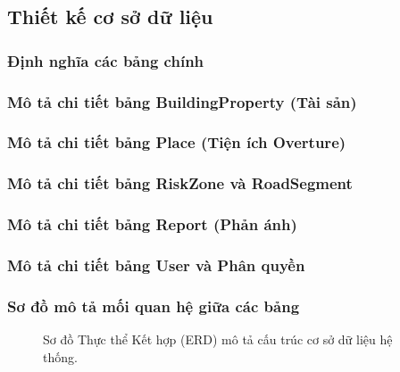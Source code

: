 \subsection{Thiết kế cơ sở dữ liệu}

\subsubsection{Định nghĩa các bảng chính}

\cleardoublepage
\subsubsection{Mô tả chi tiết bảng BuildingProperty (Tài sản)}


\subsubsection{Mô tả chi tiết bảng Place (Tiện ích Overture)}


\subsubsection{Mô tả chi tiết bảng RiskZone và RoadSegment}

\cleardoublepage
\subsubsection{Mô tả chi tiết bảng Report (Phản ánh)}

\cleardoublepage
\subsubsection{Mô tả chi tiết bảng User và Phân quyền}

\cleardoublepage
\subsubsection{Sơ đồ mô tả mối quan hệ giữa các bảng}
\begin{figure}[htbp]
    \centering
    
\caption{Sơ đồ Thực thể Kết hợp (ERD) mô tả cấu trúc cơ sở dữ liệu hệ thống.}
    \label{fig:database_erd}
\end{figure}
\cleardoublepage

